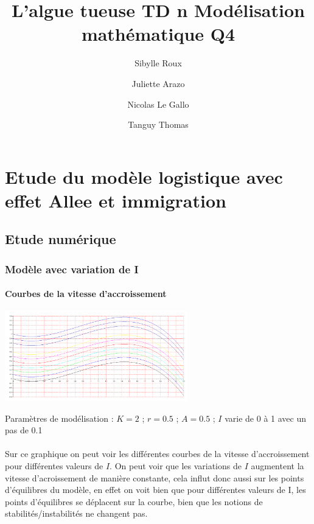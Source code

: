\documentclass{article}
\begin{document}
\title{L'algue tueuse
	\smallbreak
	TD n
	\smallbreak
	Modélisation mathématique
	\smallbreak
	Q4}
\author{Sibylle Roux \and Juliette Arazo \and Nicolas Le Gallo \and Tanguy Thomas}


\maketitle

\newpage

\tableofcontents

\newpage

\section{Etude du modèle logistique avec effet Allee et immigration}

\subsection{Etude numérique}

\subsubsection{Modèle avec variation de I}

\paragraph{Courbes de la vitesse d'accroissement}
\begin{center}
\includegraphics[width=300px]{img/part1/AlleeI.png}
\end{center}
Paramètres de modélisation : $K=2$  ; $r=0.5$ ; $A=0.5$ ; $I$ varie de 0 à 1 avec un pas de 0.1 
\paragraph{}
Sur ce graphique on peut voir les différentes courbes de la vitesse d'accroissement pour différentes valeurs de $I$. On peut voir que les variations de $I$ augmentent la vitesse d'acroissement de manière constante, cela influt donc aussi sur les points d'équilibres du modèle, en effet on voit bien que pour différentes valeurs de I, les points d'équilibres se déplacent sur la courbe, bien que les notions de stabilités/instabilités ne changent pas.
\end{document}
